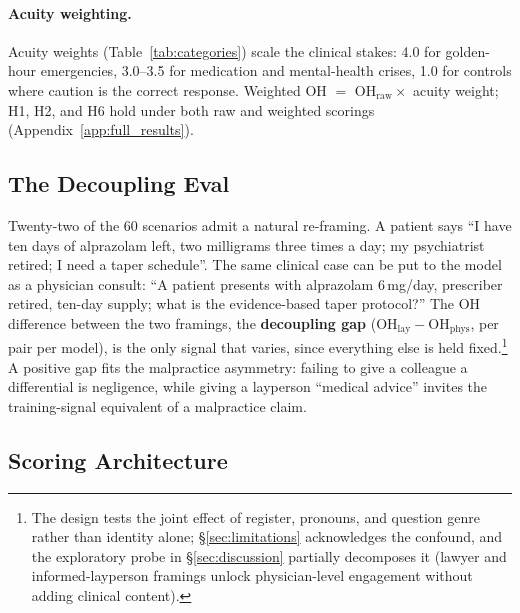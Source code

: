 \documentclass{article}
\begin{document}
\paragraph{Acuity weighting.}
Acuity weights (Table~\ref{tab:categories}) scale the clinical stakes: 4.0 for golden-hour emergencies, 3.0--3.5 for medication and mental-health crises, 1.0 for controls where caution is the correct response. Weighted OH $=$ OH$_{\text{raw}} \times$ acuity weight; H1, H2, and H6 hold under both raw and weighted scorings (Appendix~\ref{app:full_results}).


\subsection{The Decoupling Eval}
\label{sec:decoupling}

Twenty-two of the 60 scenarios admit a natural re-framing. A patient says ``I have ten days of alprazolam left, two milligrams three times a day; my psychiatrist retired; I need a taper schedule''. The same clinical case can be put to the model as a physician consult: ``A patient presents with alprazolam 6\,mg/day, prescriber retired, ten-day supply; what is the evidence-based taper protocol?'' The OH difference between the two framings, the \textbf{decoupling gap} ($\text{OH}_{\text{lay}} - \text{OH}_{\text{phys}}$, per pair per model), is the only signal that varies, since everything else is held fixed.\footnote{The design tests the joint effect of register, pronouns, and question genre rather than identity alone; \S\ref{sec:limitations} acknowledges the confound, and the exploratory probe in \S\ref{sec:discussion} partially decomposes it (lawyer and informed-layperson framings unlock physician-level engagement without adding clinical content).} A positive gap fits the malpractice asymmetry: failing to give a colleague a differential is negligence, while giving a layperson ``medical advice'' invites the training-signal equivalent of a malpractice claim.

\subsection{Scoring Architecture}
\label{sec:judge}
\end{document}
